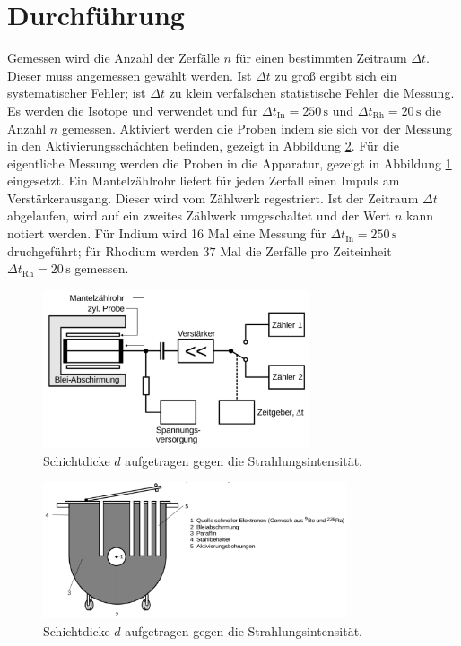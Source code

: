 \section{Durchf\"uhrung}
\label{sec:Durchfuehrung}
Gemessen wird die Anzahl der Zerfälle $n$ für einen bestimmten Zeitraum $\Delta{t}$. Dieser muss angemessen gewählt werden. Ist $\Delta{t}$ zu groß ergibt sich ein systematischer Fehler; ist $\Delta{t}$ zu klein verfälschen statistische Fehler die Messung.
Es werden die Isotope  und  verwendet und für $\Delta{t_\mathup{In}=250\,\si\second}$ und $\Delta{t_\mathup{Rh}=20\,\si\second}$ die Anzahl $n$ gemessen.
Aktiviert werden die Proben indem sie sich vor der Messung in den Aktivierungsschächten befinden, gezeigt in Abbildung \ref{fig:aktivierung}. Für die eigentliche Messung werden die Proben in die Apparatur, gezeigt in Abbildung \ref{fig:apparatur} eingesetzt. Ein Mantelzählrohr liefert für jeden Zerfall einen Impuls am Verstärkerausgang. Dieser wird vom Zählwerk regestriert. Ist der Zeitraum $\Delta{t}$ abgelaufen, wird auf ein zweites Zählwerk umgeschaltet und der Wert $n$ kann notiert werden. Für Indium wird 16 Mal eine Messung für $\Delta{t_\mathup{In}}=250\,\si\second$ druchgeführt; für Rhodium werden $37$ Mal die Zerfälle pro Zeiteinheit $\Delta{t_\mathup{Rh}}=20\,\si\second$ gemessen.
\begin{figure}
	\centering
	\includegraphics[width=0.7\textwidth]{Bilder/Aktivierung.pdf}
	\caption{Schichtdicke $d$ aufgetragen gegen die Strahlungsintensität.}
	\label{fig:apparatur}
\end{figure}

\begin{figure}[h]
	\centering
	\includegraphics[width=0.8\textwidth]{Bilder/wirklicheAktivierung.pdf}
	\caption{Schichtdicke $d$ aufgetragen gegen die Strahlungsintensität.}
	\label{fig:aktivierung}
\end{figure}
